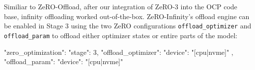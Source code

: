 Similiar to ZeRO-Offload, after our integration of ZeRO-3 into the OCP 
code base, infinity offloading worked out-of-the-box. ZeRO-Infinity's
offload engine can be enabled in Stage 3 using the two ZeRO configurations 
\texttt{offload\_optimizer} and \texttt{offload\_param} to offload 
either optimizer states or entire parts of the model:

\begin{json}
"zero_optimization": {
    "stage": 3,
    "offload_optimizer": {
        "device": "[cpu|nvme]"
    },
    "offload_param": {
        "device": "[cpu|nvme]"
    }
}
\end{json}